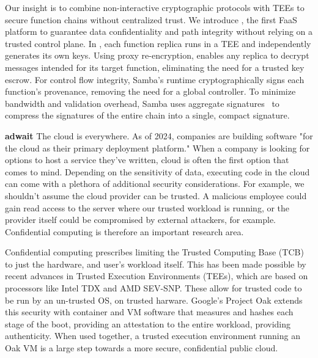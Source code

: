 %
Our insight is to combine non-interactive cryptographic protocols with
TEEs to secure function chains without centralized trust.
%
We introduce \SystemName, the first FaaS platform to guarantee data
confidentiality and path integrity without relying on a trusted control plane.
%
In \SystemName, each function replica runs in a TEE and independently generates its own keys.
%
Using proxy re-encryption, \SystemName enables any replica to decrypt
messages intended for its target function, eliminating the need for a trusted
key escrow.
%
For control flow integrity, Samba's runtime cryptographically signs each
function's provenance, removing the need for a global controller.
%
To minimize bandwidth and validation overhead, Samba uses aggregate
signatures~\cite{03-eurocrypt-aggregate_signatures_bilinear_maps} to compress
the signatures of the entire chain into a single, compact signature.







\textbf{adwait}
The cloud is everywhere.
As of 2024, companies are building software "for the cloud as their primary deployment platform." \cite{noauthor_notitle_nodate}
When a company is looking for options to host a service they've written, cloud is often the first option that comes to mind.
Depending on the sensitivity of data, executing code in the cloud can come with a plethora of additional security considerations.
For example, we shouldn't assume the cloud provider can be trusted.
A malicious employee could gain read access to the server where our trusted workload is running, or the provider itself could be compromised by external attackers, for example.
Confidential computing is therefore an important research area.

Confidential computing prescribes limiting the Trusted Computing Base (TCB) to just the hardware, and user's workload itself.
This has been made possible by recent advances in Trusted Execution Environments (TEEs), which are based on processors like Intel TDX and AMD SEV-SNP.
These allow for trusted code to be run by an un-trusted OS, on trusted harware.
Google's Project Oak extends this security with container and VM software that  measures and hashes each stage of the boot, providing an attestation to the entire workload, providing authenticity. \cite{noauthor_project-oakoak_nodate} 
When used together, a trusted execution environment running an Oak VM is a large step towards a more secure, confidential public cloud.

